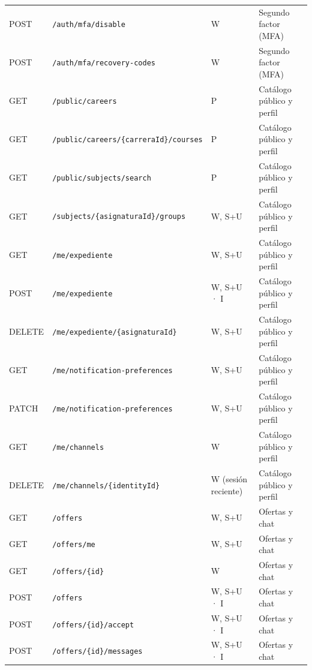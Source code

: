 \documentclass[11pt,a4paper]{report}
\begin{document}
\begin{center}
\begin{longtable}{@{}lp{7.3cm}p{2.8cm}p{3.4cm}@{}}
POST & \texttt{/\allowbreak{}auth/\allowbreak{}mfa/\allowbreak{}disable} & W & Segundo factor (MFA)\\
POST & \texttt{/\allowbreak{}auth/\allowbreak{}mfa/\allowbreak{}recovery-codes} & W & Segundo factor (MFA)\\
GET & \texttt{/\allowbreak{}public/\allowbreak{}careers} & P & Catálogo público y perfil\\
GET & \texttt{/\allowbreak{}public/\allowbreak{}careers/\allowbreak{}\{carreraId\}/\allowbreak{}courses} & P & Catálogo público y perfil\\
GET & \texttt{/\allowbreak{}public/\allowbreak{}subjects/\allowbreak{}search} & P & Catálogo público y perfil\\
GET & \texttt{/\allowbreak{}subjects/\allowbreak{}\{asignaturaId\}/\allowbreak{}groups} & W, S+U & Catálogo público y perfil\\
GET & \texttt{/\allowbreak{}me/\allowbreak{}expediente} & W, S+U & Catálogo público y perfil\\
POST & \texttt{/\allowbreak{}me/\allowbreak{}expediente} & W, S+U · I & Catálogo público y perfil\\
DELETE & \texttt{/\allowbreak{}me/\allowbreak{}expediente/\allowbreak{}\{asignaturaId\}} & W, S+U & Catálogo público y perfil\\
GET & \texttt{/\allowbreak{}me/\allowbreak{}notification-preferences} & W, S+U & Catálogo público y perfil\\
PATCH & \texttt{/\allowbreak{}me/\allowbreak{}notification-preferences} & W, S+U & Catálogo público y perfil\\
GET & \texttt{/\allowbreak{}me/\allowbreak{}channels} & W & Catálogo público y perfil\\
DELETE & \texttt{/\allowbreak{}me/\allowbreak{}channels/\allowbreak{}\{identityId\}} & W (sesión reciente) & Catálogo público y perfil\\
GET & \texttt{/\allowbreak{}offers} & W, S+U & Ofertas y chat\\
GET & \texttt{/\allowbreak{}offers/\allowbreak{}me} & W, S+U & Ofertas y chat\\
GET & \texttt{/\allowbreak{}offers/\allowbreak{}\{id\}} & W & Ofertas y chat\\
POST & \texttt{/\allowbreak{}offers} & W, S+U · I & Ofertas y chat\\
POST & \texttt{/\allowbreak{}offers/\allowbreak{}\{id\}/\allowbreak{}accept} & W, S+U · I & Ofertas y chat\\
POST & \texttt{/\allowbreak{}offers/\allowbreak{}\{id\}/\allowbreak{}messages} & W, S+U · I & Ofertas y chat\\

\end{longtable}
\end{center}
\end{document}
